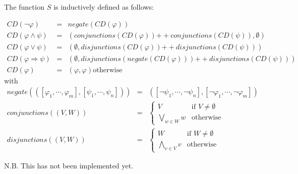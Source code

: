 \documentclass{article}
\newcommand{\concat}{\ensuremath{+\!\!+}}
\begin{document}
The function $S$ is inductively defined as follows:

\begin{equation*}
\begin{array}{lll}
CD\left( \lnot \varphi \right) & = & negate\left( CD\left( \varphi \right)
\right) \\
CD\left( \varphi \wedge \psi \right) & = & \left( conjunctions\left(
CD\left( \varphi \right) \right) \concat conjunctions\left( CD\left( \psi
\right) \right) ,\emptyset \right) \\
CD\left( \varphi \vee \psi \right) & = & \left( \emptyset
,disjunctions\left( CD\left( \varphi \right) \right) \concat %
disjunctions\left( CD\left( \psi \right) \right) \right) \\
CD\left( \varphi \Rightarrow \psi \right) & = & \left( \emptyset
,disjunctions\left( negate(CD\left( \varphi \right) )\right) \concat %
disjunctions\left( CD\left( \psi \right) \right) \right) \\
CD\left( \varphi \right) & = & \left( \varphi ,\varphi \right) \text{
otherwise}%
\end{array}%
\end{equation*}%
with%
\begin{equation*}
\begin{array}{lll}
negate\left( \left( \left[ \varphi _{1},\cdots ,\varphi _{m}\right] ,\left[
\psi _{1},\cdots ,\psi _{n}\right] \right) \right) & = & \left( \left[ \lnot
\psi _{1},\cdots ,\lnot \psi _{n}\right] ,\left[ \lnot \varphi _{1},\cdots
,\lnot \varphi _{m}\right] \right) \\
conjunctions\left( \left( V,W\right) \right) & = & \left\{
\begin{array}{ll}
V & \text{if }V\neq \emptyset \\
\bigvee\limits_{w\in W}w & \text{otherwise}%
\end{array}%
\right. \\
disjunctions\left( \left( V,W\right) \right) & = & \left\{
\begin{array}{ll}
W & \text{if }W\neq \emptyset \\
\bigwedge\limits_{v\in V}v & \text{otherwise}%
\end{array}%
\right.%
\end{array}%
\end{equation*}

N.B. This has not been implemented yet.
\end{document}
